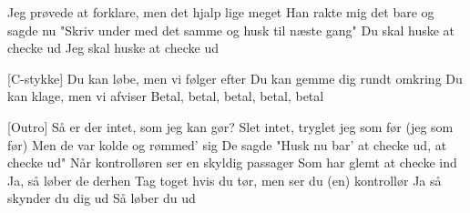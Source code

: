 \documentclass[a4paper,11pt]{article}
\begin{document}
\begin{song}
 Jeg prøvede at forklare, men det hjalp lige meget
    Han rakte mig det bare og sagde nu
    "Skriv under med det samme og husk til næste gang"
 Du skal huske at checke ud
 Jeg skal huske at checke ud


[C-stykke] Du kan løbe, men vi følger efter
    Du kan gemme dig rundt omkring
    Du kan klage, men vi afviser
    Betal, betal, betal, betal, betal

[Outro] Så er der intet, som jeg kan gør?
    Slet intet, tryglet jeg som før (jeg som før)
    Men de var kolde og rømmed' sig
    De sagde "Husk nu bar' at checke ud, at checke ud"
    Når kontrolløren ser en skyldig passager
    Som har glemt at checke ind
    Ja, så løber de derhen
    Tag toget hvis du tør, men ser du (en) kontrollør
    Ja så skynder du dig ud
    Så løber du ud
\end{song}
\end{document}
